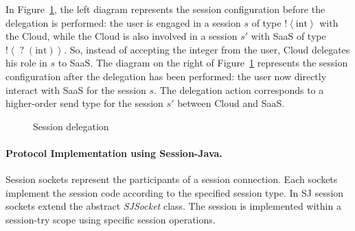 \documentclass[10pt]{llncs}
\begin{document}
In Figure~\ref{fig:sj-delegation}, the left diagram represents the session configuration before the delegation is performed: the user is engaged in a session $s$ of type $\mathopen{!}\left<\text{int}\right>$ with the Cloud, while the Cloud is also involved in a session $s'$ with SaaS of type $\mathopen{!}\left<\mathopen{?}\left(\text{int}\right)\right>$. So, instead of accepting the integer from the user, Cloud delegates his role in $s$ to SaaS.
The diagram on the right of Figure~\ref{fig:sj-delegation} represents the session configuration after the delegation has been performed: the user now directly interact with SaaS for the session $s$.
The delegation action corresponds to a higher-order send type for the session $s'$ between Cloud and SaaS.
%
\begin{figure}[ht]
\centering
{}
\caption{Session delegation}\label{fig:sj-delegation}
\end{figure}

\paragraph{Protocol Implementation using Session-Java.}
Session sockets represent the participants of a session connection.
Each sockets implement the session code according to the specified session type.
In SJ session sockets extend the abstract \textit{SJSocket} class. %
The session is implemented within a session-try scope using specific session operations. %
\end{document}
